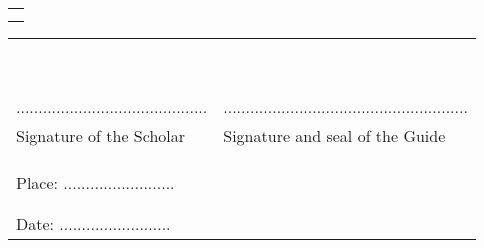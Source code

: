 %
%
\begin{tabular}{c}
 \\
 \\
 \\
\end{tabular}
%
%
%
\begin{tabular}{p{7cm}p{8cm}}
 & \\
 & \\
 & \\
 & \\
 & \\
 & \\
 & \\
 & \\
 & \\
........................................... & \hspace{2cm} ....................................................... \\
Signature of the Scholar & \hspace{2cm} Signature and seal of the Guide \\
 & \\
 & \\
 & \\
Place: ......................... & \\
 & \\
 & \\
Date: ......................... &
\end{tabular}
